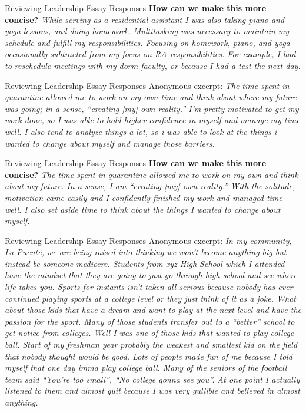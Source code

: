 \documentclass{beamer}
\begin{document}
\begin{frame}{Reviewing Leadership Essay Responses}
\textbf{How can we make this more concise?}
\textit{While serving as a residential assistant I was also taking piano and yoga lessons, and doing homework.  Multitasking was necessary to maintain my schedule and fulfill my responsibilities.  Focusing on homework, piano, and yoga occasionally subtracted from my focus on RA responsibilities.  For example, I had to reschedule meetings with my dorm faculty, or because I had a test the next day.}
\end{frame}

\begin{frame}{Reviewing Leadership Essay Responses}
\underline{Anonymous excerpt:}
\textit{The time spent in quarantine allowed me to work on my own time and think about
where my future was going; in a sense, “creating [my] own reality.” I’m pretty motivated to get
my work done, so I was able to hold higher confidence in myself and manage my time well. I
also tend to analyze things a lot, so i was able to look at the things i wanted to change about
myself and manage those barriers.}
\end{frame}

\begin{frame}{Reviewing Leadership Essay Responses}
\textbf{How can we make this more concise?}
\textit{The time spent in quarantine allowed me to work on my own and think about my future.  In a sense, I am “creating [my] own reality.”  With the solitude, motivation came easily and I confidently finished my work and managed time well.  I also set aside time to think about the things I wanted to change about myself.}
\end{frame}

\begin{frame}{Reviewing Leadership Essay Responses}
\small
\underline{Anonymous excerpt:}
\textit{In my community, La Puente, we are being raised into thinking we won't become
anything big but instead be someone mediocre. Students from xyz High School which I
attended have the mindset that they are going to just go through high school and see where life
takes you. Sports for instants isn't taken all serious because nobody has ever continued playing
sports at a college level or they just think of it as a joke. What about those kids that have a dream
and want to play at the next level and have the passion for the sport. Many of those students
transfer out to a “better” school to get notice from colleges. Well I was one of those kids that
wanted to play college ball. Start of my freshman year probably the weakest and smallest kid on
the field that nobody thought would be good. Lots of people made fun of me because I told
myself that one day imma play college ball. Many of the seniors of the football team said
“You're too small”, “No college gonna see you”. At one point I actually listened to them and
almost quit because I was very gullible and believed in almost anything.}
\end{frame}
\end{document}

